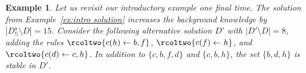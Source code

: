 \documentclass[letterpaper]{article} %
\newcommand{\adm}{\textit{ad}}
\newcommand{\com}{\textit{co}}
\newcommand{\stb}{\textit{st}}
\newcommand{\prf}{\textit{pr}}
\newcommand{\asm}{\ensuremath{\mathcal{A}}}
\newcommand{\atoms}{\mathcal{L}}
\newcommand{\ruleset}{\mathcal{R}}
\newcommand{\assumptions}{\mathcal{A}}
\newcommand{\contra}{c}
\newcommand{\contrary}[1]{c(#1)}
\newcommand{\ABAdef}{D=(\atoms,\ruleset,\assumptions,\contra)}
\newcommand{\setS}{\mathbb{S}}
\newcommand{\hypo}{H}
\newcommand{\Xpos}{\mathcal{X}^{pos}}
\newcommand{\Xneg}{\mathcal{X}^{neg}}
\newtheorem{example}{Example}[section]
\begin{document}
\begin{example}
    Let us revisit our introductory example one final time. The solution from Example~\ref{ex:intro solution} increases the background knowledge by  $|D_\setS^\star\setminus D|=15$. Consider the following alternative solution $D'$ with $|D'\setminus D|=8$, adding the rules $\rcoltwo{\contrary{h} \gets b,f}$, $\rcoltwo{\contrary{f} \gets h}$, and $\rcoltwo{\contrary{d} \gets c,h}$.
    In addition to $\{c,b,f,d\}$ and $\{c,b,h\}$, the set $\{b,d,h\}$ is stable in $D'$.








\end{example}


\end{document}
